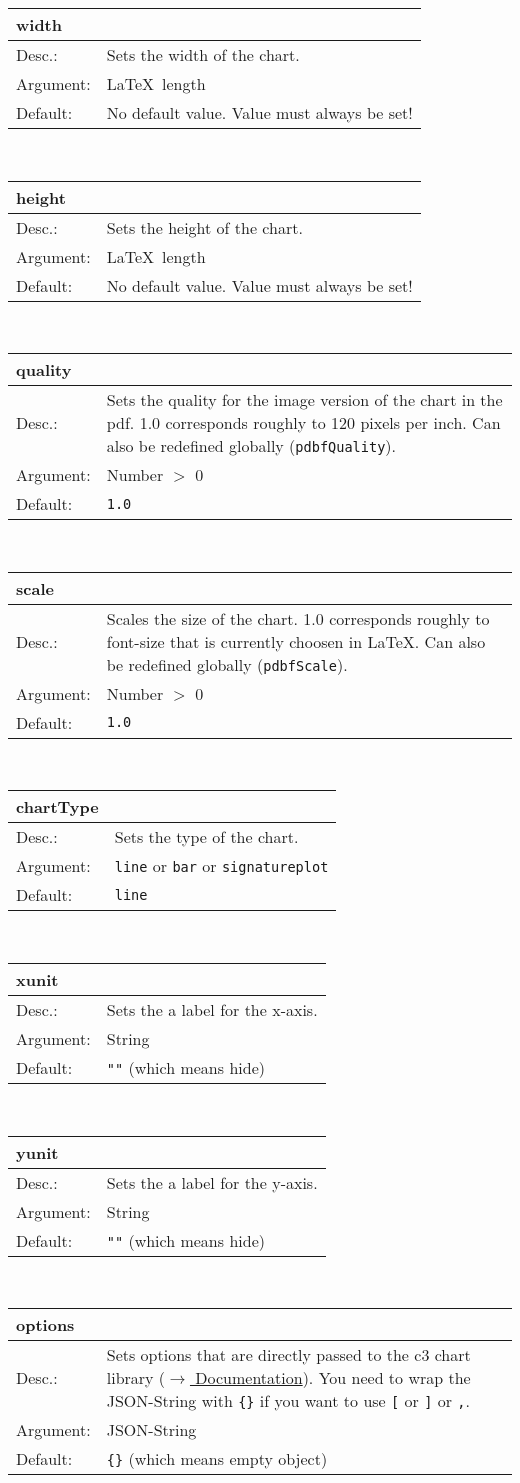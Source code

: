 \documentclass[11pt]{article}
\def\a{5cm}
\def\b{10.5cm}
\def\option#1#2#3#4{%
\noindent \begin{tabular}{|p{\a}|p{\b}|}
\hline
\textbf{#1} & \\
\hline
Desc.: & #2 \\
\hline
Argument: & #3\\
\hline
Default:& #4\\
\hline
\end{tabular} \\[4pt]%
}
\begin{document}
\option
{width}
{Sets the width of the chart.}
{\LaTeX~length}
{No default value. Value must always be set!}

\option
{height}
{Sets the height of the chart.}
{\LaTeX~length}
{No default value. Value must always be set!}

\option
{quality}
{Sets the quality for the image version of the chart in the pdf. 1.0 corresponds roughly to 120 pixels per inch. Can also be redefined globally (\texttt{pdbfQuality}).}
{Number $>$ 0}
{\texttt{1.0}}

\option
{scale}
{Scales the size of the chart. 1.0 corresponds roughly to font-size that is currently choosen in \LaTeX. Can also be redefined globally (\texttt{pdbfScale}).}
{Number $>$ 0}
{\texttt{1.0}}

\option
{chartType}
{Sets the type of the chart.}
{\texttt{line} or \texttt{bar} or \texttt{signatureplot}}
{\texttt{line}}

\option
{xunit}
{Sets the a label for the x-axis.}
{String}
{\texttt{""} (which means hide)}

\option
{yunit}
{Sets the a label for the y-axis.}
{String}
{\texttt{""} (which means hide)}

\option
{options}
{Sets options that are directly passed to the c3 chart library (\href{http://c3js.org/reference.html}{$\rightarrow$ Documentation}). You need to wrap the JSON-String with \texttt{\{\}} if you want to use \texttt{[} or \texttt{]} or \texttt{,}.}
{JSON-String}
{\texttt{\{\}} (which means empty object)}

%
%
%
%
%
%
\end{document}
